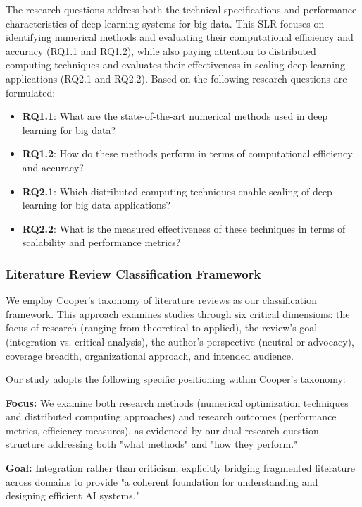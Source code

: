 \documentclass[acmsmall]{acmart}
\begin{document}
The research questions address both the technical specifications and performance characteristics of deep learning systems for big data. This SLR focuses on identifying numerical methods and evaluating their computational efficiency and accuracy (RQ1.1 and RQ1.2), while also paying attention to distributed computing techniques and evaluates their effectiveness in scaling deep learning applications (RQ2.1 and RQ2.2). Based on the following research questions are formulated:

\begin{itemize}
    \item \textbf{RQ1.1}: What are the state-of-the-art numerical methods used in deep learning for big data?
    \item \textbf{RQ1.2}: How do these methods perform in terms of computational efficiency and accuracy?
    \item \textbf{RQ2.1}: Which distributed computing techniques enable scaling of deep learning for big data applications?
    \item \textbf{RQ2.2}: What is the measured effectiveness of these techniques in terms of scalability and performance metrics?
\end{itemize}



\subsubsection{Literature Review Classification Framework}\label{subsubsec:phase-1-planning-and-protocol-development:literature-review-classification-framework}
We employ Cooper's taxonomy of literature reviews \citep{cooper1988organizing} as our classification framework. This approach examines studies through six critical dimensions: the focus of research (ranging from theoretical to applied), the review's goal (integration vs. critical analysis), the author's perspective (neutral or advocacy), coverage breadth, organizational approach, and intended audience.

Our study adopts the following specific positioning within Cooper's taxonomy:

\textbf{Focus:} We examine both research methods (numerical optimization techniques and distributed computing approaches) and research outcomes (performance metrics, efficiency measures), as evidenced by our dual research question structure addressing both "what methods" and "how they perform."

\textbf{Goal:} Integration rather than criticism, explicitly bridging fragmented literature across domains to provide "a coherent foundation for understanding and designing efficient AI systems."
\end{document}
